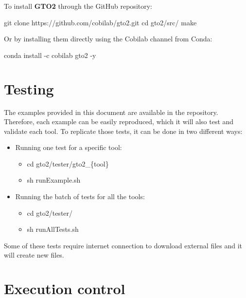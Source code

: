 \documentclass[11pt,]{krantz}
\newenvironment{Shaded}{\begin{snugshade}}{\end{snugshade}}
\newcommand{\FunctionTok}[1]{\textcolor[rgb]{0,0,0}{#1}}
\newcommand{\BuiltInTok}[1]{#1}
\newcommand{\ExtensionTok}[1]{#1}
\newcommand{\NormalTok}[1]{#1}
\providecommand{\tightlist}{%
  \setlength{\itemsep}{0pt}\setlength{\parskip}{0pt}}
\begin{document}
To install \textbf{GTO2} through the GitHub repository:

\begin{Shaded}
\begin{Highlighting}[]
\FunctionTok{git}\NormalTok{ clone https://github.com/cobilab/gto2.git}
\BuiltInTok{cd}\NormalTok{ gto2/src/}
\FunctionTok{make}
\end{Highlighting}
\end{Shaded}

Or by installing them directly using the Cobilab channel from Conda:

\begin{Shaded}
\begin{Highlighting}[]
\ExtensionTok{conda}\NormalTok{ install -c cobilab gto2 -y}
\end{Highlighting}
\end{Shaded}

\section{Testing}\label{testing}

The examples provided in this document are available in the repository.
Therefore, each example can be easily reproduced, which it will also
test and validate each tool. To replicate those tests, it can be done in
two different ways:

\begin{itemize}
\tightlist
\item
  Running one test for a specific tool:

  \begin{itemize}
  \tightlist
  \item
    cd gto2/tester/gto2\_\{tool\}
  \item
    sh runExample.sh
  \end{itemize}
\item
  Running the batch of tests for all the tools:

  \begin{itemize}
  \tightlist
  \item
    cd gto2/tester/
  \item
    sh runAllTests.sh
  \end{itemize}
\end{itemize}

Some of these tests require internet connection to download external
files and it will create new files.

\section{Execution control}\label{execution-control}
\end{document}
